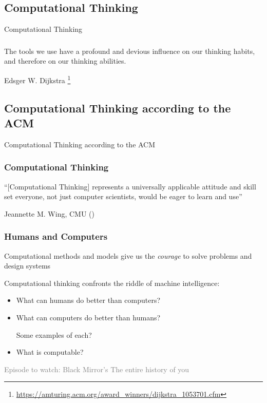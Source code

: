 \documentclass[xcolor=x11names]{beamer}
\newcommand{\light}[1]{\textcolor{gray}{#1}}
\begin{document}
\begin{frame}
\section{Computational Thinking}
\centering
\alert{Computational Thinking}
\end{frame}





\begin{frame}
\frametitle{}
The tools we use have a profound and devious influence on our thinking habits, 
and therefore on our thinking abilities.
\begin{flushright}
Edsger W. Dijkstra%
\footnote{\url{https://amturing.acm.org/award_winners/dijkstra_1053701.cfm}}
\end{flushright}
\end{frame}



\begin{frame}
\section{Computational Thinking according to the ACM}
\centering
\alert{Computational Thinking according to the ACM}
\end{frame}

\begin{frame}
\frametitle{Computational Thinking}
``[Computational Thinking] represents a universally applicable attitude and
skill set \alert{everyone}, not just computer scientists, would be eager to
learn and use''
\begin{flushright}
	Jeannette M. Wing, CMU (\citeyear{Wing2006})
\end{flushright}
\end{frame}


\begin{frame}
\frametitle{Humans and Computers}

Computational methods and models give us the \textit{courage} to solve problems 
and design systems
\bigskip 			\pause

Computational thinking confronts the riddle of machine intelligence:
\begin{itemize}
 \item What can humans do better than computers?

\item What can computers do better than humans?
\bigskip											\pause

\alert{Some examples of each?}
\bigskip 											\pause


\item What is computable?

\end{itemize}
\bigskip

\light{Episode to watch: Black Mirror's The entire history of you}
\end{frame}
\end{document}
